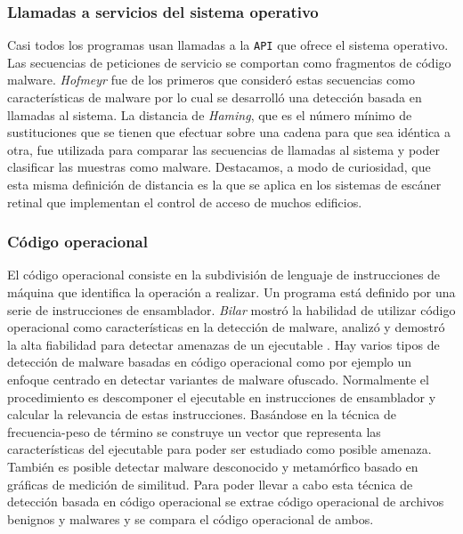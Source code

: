 \documentclass[12pt]{article}
\begin{document}
            \subsubsection{Llamadas a servicios del sistema operativo}
                Casi todos los programas usan llamadas a la \texttt{API} que ofrece el sistema operativo. Las secuencias de peticiones de servicio se comportan como fragmentos de código malware. \textit{Hofmeyr} fue de los primeros que consideró estas secuencias como características de malware \cite{bib:malware_calls} por lo cual se desarrolló una detección basada en llamadas al sistema. La distancia de \textit{Haming}, que es el número mínimo de sustituciones que se tienen que efectuar sobre una cadena para que sea idéntica a otra, fue utilizada para comparar las secuencias de llamadas al sistema y poder clasificar las muestras como malware. Destacamos, a modo de curiosidad, que esta misma definición de distancia es la que se aplica en los sistemas de escáner retinal que implementan el control de acceso de muchos edificios.

            \subsubsection{Código operacional}
                El código operacional consiste en la subdivisión de lenguaje de instrucciones de máquina que identifica la operación a realizar. Un programa está definido por una serie de instrucciones de ensamblador. \textit{Bilar} mostró la habilidad de utilizar código operacional como características en la detección de malware, analizó y demostró la alta fiabilidad para detectar amenazas de un ejecutable \cite{bib:malware_asm}. Hay varios tipos de detección de malware basadas en código operacional como por ejemplo un enfoque centrado en detectar variantes de malware ofuscado. Normalmente el procedimiento es descomponer el ejecutable en instrucciones de ensamblador y calcular la relevancia de estas instrucciones. Basándose en la técnica de frecuencia-peso de término se construye un vector que representa las características del ejecutable para poder ser estudiado como posible amenaza. También es posible detectar malware desconocido  y metamórfico basado en gráficas de medición de similitud. Para poder llevar a cabo esta técnica de detección basada en código operacional se extrae código operacional de archivos benignos y malwares y se compara el código operacional de ambos.
\end{document}
